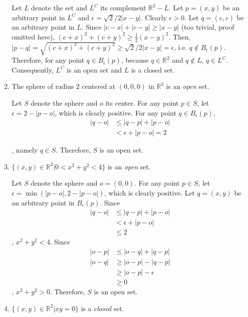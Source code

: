 \documentclass{homework}
\begin{document}
\begin{problem}{5}
\begin{enumerate}
Let $L$ denote the set and $L^C$ its complement $\mathbb{R}^2 - L$. Let $p = (x, y)$ be an arbitrary point in $L^C$ and $\epsilon = \sqrt{2}/2|x - y|$. Clearly $\epsilon > 0$. Let  $q = (c, c)$ be an arbitrary point in $L$. Since $|c - x| + |c - y| \geq |x - y|$ (too trivial, proof omitted here), $(c + x)^2 + (c + y)^2 \geq \frac{1}{2}(x - y)^2$. Then, $|p - q| = \sqrt{(c + x)^2 + (c + y)^2} \geq \sqrt{2}/2|x - y| = \epsilon$, i.e. $q \notin B_{\epsilon}(p)$. Therefore, for any point $q \in B_{\epsilon}(p)$, because $q \in \mathbb{R}^2$ and $q \notin L$, $q \in L^C$. Consequently, $L^C$ is an open set and $L$ is a closed set. \QED

\item The sphere of radius $2$ centered at $(0, 0, 0)$ in $\mathbb{R}^3$ is an \emph{open} set.

Let $S$ denote the sphere and $o$ its center. For any point $p \in S$, let $\epsilon = 2- |p - o|$, which is clearly positive. For any point $q \in B_{\epsilon}(p)$,
\begin{align*}
|q - o| &\leq |q - p| + |p - o| \\
        &<    \epsilon + |p - o| = 2
\end{align*}

, namely $q \in S$. Therefore, $S$ is an open set. \QED
\item $\{(x, y) \in \mathbb{R}^2 | 0 < x^2 + y^2 < 4\}$ is an \emph{open} set.

Let $S$ denote the sphere and $o = (0, 0)$. For any point $p \in S$, let $\epsilon = \min(|p - o|, 2- |p - o|)$, which is clearly positive. Let $q = (x, y)$ be an arbitrary point in $B_{\epsilon}(p)$. Since
\begin{align*}
|q - o| &\leq |q - p| + |p - o| \\
        &<    \epsilon + |p - o| \\
        &\leq 2
\end{align*}
, $x^2 + y^2 < 4$. Since
\begin{align*}
|o - p| &\leq |o - q| + |q - p| \\
|o - q| &\geq |o - p| - |q - p| \\
        &\ge  |o - p| - \epsilon \\
        &\geq 0
\end{align*}
, $x^2 + y^2 > 0$. Therefore, $S$ is an open set. \QED

\item $\{(x, y) \in \mathbb{R}^2 | xy = 0\}$ is a \emph{closed} set.


\end{enumerate}
\end{problem}
\end{document}
